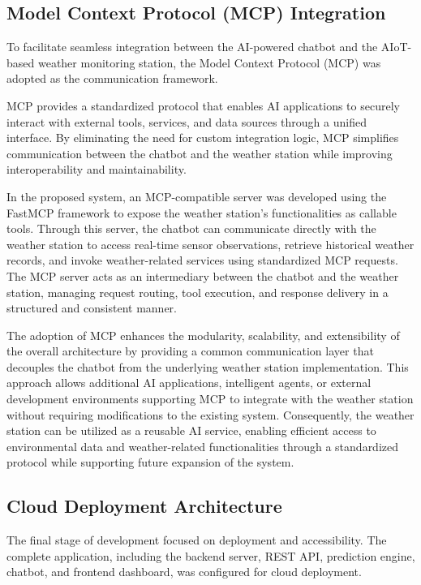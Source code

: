 \documentclass[12pt]{article}
\begin{document}
\subsection{Model Context Protocol (MCP) Integration}
To facilitate seamless integration between the AI-powered chatbot and the AIoT-based weather monitoring station, the Model Context Protocol (MCP) was adopted as the communication framework.

MCP provides a standardized protocol that enables AI applications to securely interact with external tools, services, and data sources through a unified interface. By eliminating the need for custom integration logic, MCP simplifies communication between the chatbot and the weather station while improving interoperability and maintainability.

In the proposed system, an MCP-compatible server was developed using the FastMCP framework to expose the weather station's functionalities as callable tools. Through this server, the chatbot can communicate directly with the weather station to access real-time sensor observations, retrieve historical weather records, and invoke weather-related services using standardized MCP requests. The MCP server acts as an intermediary between the chatbot and the weather station, managing request routing, tool execution, and response delivery in a structured and consistent manner.

The adoption of MCP enhances the modularity, scalability, and extensibility of the overall architecture by providing a common communication layer that decouples the chatbot from the underlying weather station implementation. This approach allows additional AI applications, intelligent agents, or external development environments supporting MCP to integrate with the weather station without requiring modifications to the existing system. Consequently, the weather station can be utilized as a reusable AI service, enabling efficient access to environmental data and weather-related functionalities through a standardized protocol while supporting future expansion of the system.

\subsection{Cloud Deployment Architecture}
The final stage of development focused on deployment and accessibility. The complete application, including the backend server, REST API, prediction engine, chatbot, and frontend dashboard, was configured for cloud deployment.
\end{document}
